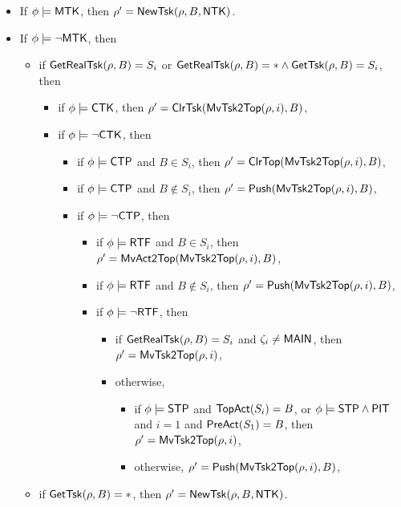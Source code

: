 \begin{itemize}
\item If $\phi \models {\sf MTK}$,  then $\rho' = \mathsf{NewTsk}(\rho, B, {\sf NTK})$.
%
\item If $\phi \models \neg {\sf MTK}$,  then
	\begin{itemize}
        \item if $\mathsf{GetRealTsk}(\rho, B) = S_i$ or $\mathsf{GetRealTsk}(\rho,B) = * \wedge\mathsf{GetTsk}(\rho,B) = S_i$, then
		\begin{itemize}
			\item if $\phi \models {\sf CTK}$, then $\rho'=\mathsf{ClrTsk}(\mathsf{MvTsk2Top}(\rho, i), B)$,
			\item if $\phi \models \neg {\sf CTK}$, then
			\begin{itemize}
				\item if $\phi \models {\sf CTP}$ and $B \in S_i$, then 
				$\rho'=\mathsf{ClrTop}(\mathsf{MvTsk2Top}(\rho, i), B)$,
				\item if $\phi \models {\sf CTP}$ and $B \notin S_i$, then 
				$\rho'=\mathsf{Push}(\mathsf{MvTsk2Top}(\rho, i), B)$,
				\item if $\phi \models \neg {\sf CTP}$, then
				\begin{itemize}
					\item if $\phi \models {\sf RTF}$ and $B \in S_i$, then
				$\rho'=\mathsf{MvAct2Top}(\mathsf{MvTsk2Top}(\rho, i), B)$,
					\item if $\phi \models {\sf RTF}$ and $B \notin S_i$, then
				$\rho'=\mathsf{Push}(\mathsf{MvTsk2Top}(\rho, i), B)$,
					\item if $\phi \models \neg {\sf RTF}$, then
					\begin{itemize}
						\item if $\mathsf{GetRealTsk}(\rho, B) = S_i$ and $\zeta_i \neq {\sf MAIN}$, 
						then $\rho' = \mathsf{MvTsk2Top}(\rho, i)$,
						\item otherwise, 
						\begin{itemize}
							\item if $\phi \models {\sf STP}$ and $\mathsf{TopAct}(S_i) = B$, or $\phi \models {\sf STP} \wedge {\sf PIT}$ and $i = 1$ and $\mathsf{PreAct}(S_1) = B$, then $\rho' = \mathsf{MvTsk2Top}(\rho, i)$,
							\item otherwise, $\rho'=\mathsf{Push}(\mathsf{MvTsk2Top}(\rho, i), B)$,
						\end{itemize}
					\end{itemize}
				\end{itemize}
			\end{itemize}
		\end{itemize}
	\item if $\mathsf{GetTsk}(\rho, B) = *$, then $\rho' = \mathsf{NewTsk}(\rho, B, {\sf NTK})$.
	\end{itemize}
\end{itemize}

